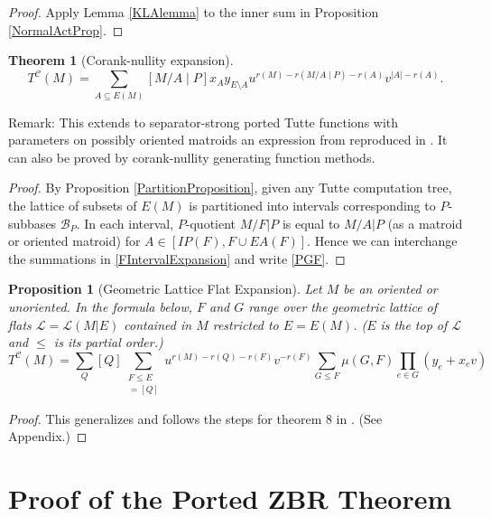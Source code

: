 \documentclass[12pt,leqno]{amsart}
\newtheorem{prop}[lem]{Proposition}
\newtheorem{thm}[lem]{Theorem}
\theoremstyle{remark}
\begin{document}
\begin{proof}
Apply Lemma \ref{KLAlemma} to the inner sum in
Proposition \ref{NormalActProp}.
\end{proof}

\begin{thm}[Corank-nullity expansion]
\begin{equation}
\tag{PGF}
\label{PGF}
T^{\mathcal{C}}(M) = \sum_{A\subseteq E(M)}[M/A \mid P]x_A y_{E\setminus A}
u^{r(M)-r(M/A\mid P)-r(A)}
v^{|A|-r(A)}.
\end{equation}
\end{thm}

Remark: This extends to separator-strong ported Tutte functions
with parameters on possibly oriented matroids
an expression from \cite{MR0419272} reproduced in \cite{sdcPorted}.  It can
also be proved by corank-nullity generating function methods.

\begin{proof}
By Proposition \ref{PartitionProposition}, given any Tutte computation tree,
the lattice of subsets of $E(M)$ is partitioned
into intervals corresponding to $P$-subbases $\mathcal{B}_P$.  
In each interval, 
$P$-quotient $M/F|P$ is equal to 
$M/A|P$ (as a matroid or oriented matroid)
for 
$A\in [IP(F),F\cup EA(F)]$.
Hence we can 
interchange the summations in \eqref{FIntervalExpansion} and write
\eqref{PGF}.
\end{proof}


\begin{prop}[Geometric Lattice Flat Expansion]
\label{GFlatProp}
Let $M$ be an oriented or unoriented.
In the formula below,
$F$ and $G$ range over the geometric lattice of flats 
$\mathcal{L}=\mathcal{L}(M|E)$ contained
in $M$ restricted to $E = E(M)$.  
($E$ is the top of $\mathcal{L}$ and $\le$
is its partial order.)
\[
T^{\mathcal{C}}(M) = \sum_{Q} [Q]
      \sum_{\substack{F\leq E\\
                     [M/F|P]=[Q]
           }}
                   u^{r(M)-r(Q)-r(F)}
                   v^{-r(F)}
                   \sum_{G\le F}
                   \mu(G,F)
                   \prod_{e\in G}
                    (y_e+x_ev)
\]
\end{prop}

\begin{proof}
This 
generalizes and 
follows the steps for theorem 8 in \cite{sdcPorted}.  (See Appendix.)
\end{proof}


\section{Proof of the Ported ZBR Theorem}
\end{document}
